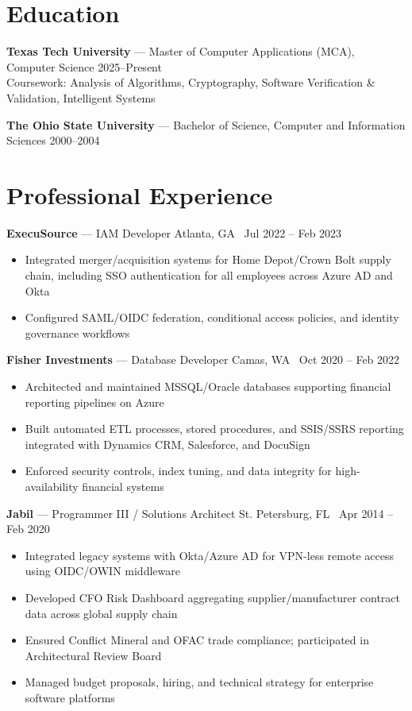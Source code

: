 \documentclass[10pt,letterpaper]{article}
\begin{document}
\section{Education}
\textbf{Texas Tech University} --- Master of Computer Applications (MCA), Computer Science \hfill 2025--Present\\
Coursework: Analysis of Algorithms, Cryptography, Software Verification \& Validation, Intelligent Systems

\textbf{The Ohio State University} --- Bachelor of Science, Computer and Information Sciences \hfill 2000--2004

\section{Professional Experience}

\textbf{ExecuSource} --- IAM Developer \hfill Atlanta, GA \textbullet\ Jul 2022 -- Feb 2023
\begin{itemize}
    \item Integrated merger/acquisition systems for Home Depot/Crown Bolt supply chain, including SSO authentication for all employees across Azure AD and Okta
    \item Configured SAML/OIDC federation, conditional access policies, and identity governance workflows
\end{itemize}

\textbf{Fisher Investments} --- Database Developer \hfill Camas, WA \textbullet\ Oct 2020 -- Feb 2022
\begin{itemize}
    \item Architected and maintained MSSQL/Oracle databases supporting financial reporting pipelines on Azure
    \item Built automated ETL processes, stored procedures, and SSIS/SSRS reporting integrated with Dynamics CRM, Salesforce, and DocuSign
    \item Enforced security controls, index tuning, and data integrity for high-availability financial systems
\end{itemize}

\textbf{Jabil} --- Programmer III / Solutions Architect \hfill St. Petersburg, FL \textbullet\ Apr 2014 -- Feb 2020
\begin{itemize}
    \item Integrated legacy systems with Okta/Azure AD for VPN-less remote access using OIDC/OWIN middleware
    \item Developed CFO Risk Dashboard aggregating supplier/manufacturer contract data across global supply chain
    \item Ensured Conflict Mineral and OFAC trade compliance; participated in Architectural Review Board
    \item Managed budget proposals, hiring, and technical strategy for enterprise software platforms
\end{itemize}
\end{document}
